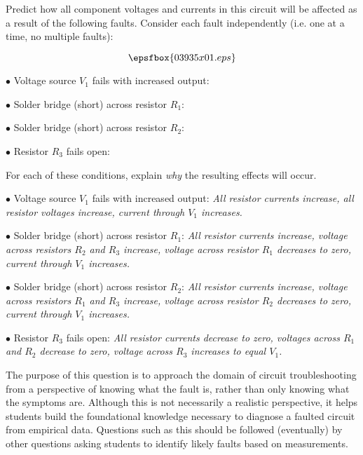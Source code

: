 

Predict how all component voltages and currents in this circuit will be affected as a result of the following faults.  Consider each fault independently (i.e. one at a time, no multiple faults):

$$\epsfbox{03935x01.eps}$$

\medskip
\item{$\bullet$} Voltage source $V_1$ fails with increased output:
\vskip 5pt
\item{$\bullet$} Solder bridge (short) across resistor $R_1$: 
\vskip 5pt
\item{$\bullet$} Solder bridge (short) across resistor $R_2$: 
\vskip 5pt
\item{$\bullet$} Resistor $R_3$ fails open: 
\medskip

For each of these conditions, explain {\it why} the resulting effects will occur.







\medskip
\item{$\bullet$} Voltage source $V_1$ fails with increased output: {\it All resistor currents increase, all resistor voltages increase, current through $V_1$ increases.}
\vskip 5pt
\item{$\bullet$} Solder bridge (short) across resistor $R_1$: {\it All resistor currents increase, voltage across resistors $R_2$ and $R_3$ increase, voltage across resistor $R_1$ decreases to zero, current through $V_1$ increases.}
\vskip 5pt
\item{$\bullet$} Solder bridge (short) across resistor $R_2$: {\it All resistor currents increase, voltage across resistors $R_1$ and $R_3$ increase, voltage across resistor $R_2$ decreases to zero, current through $V_1$ increases.}
\vskip 5pt
\item{$\bullet$} Resistor $R_3$ fails open: {\it  All resistor currents decrease to zero, voltages across $R_1$ and $R_2$ decrease to zero, voltage across $R_3$ increases to equal $V_1$.}
\medskip







The purpose of this question is to approach the domain of circuit troubleshooting from a perspective of knowing what the fault is, rather than only knowing what the symptoms are.  Although this is not necessarily a realistic perspective, it helps students build the foundational knowledge necessary to diagnose a faulted circuit from empirical data.  Questions such as this should be followed (eventually) by other questions asking students to identify likely faults based on measurements.




